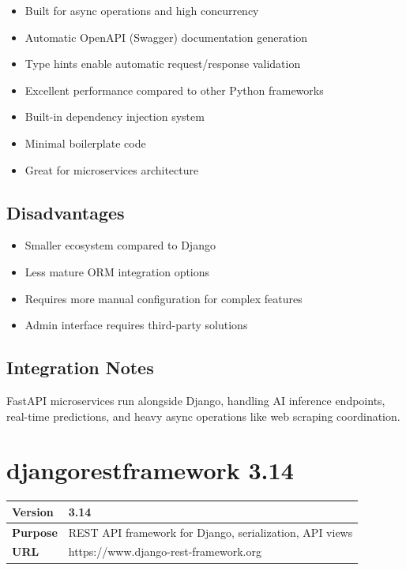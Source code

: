 \documentclass[12pt,a4paper]{report}
\begin{document}
\begin{itemize}
    \item Built for async operations and high concurrency
    \item Automatic OpenAPI (Swagger) documentation generation
    \item Type hints enable automatic request/response validation
    \item Excellent performance compared to other Python frameworks
    \item Built-in dependency injection system
    \item Minimal boilerplate code
    \item Great for microservices architecture
\end{itemize}

\subsection{Disadvantages}

\begin{itemize}
    \item Smaller ecosystem compared to Django
    \item Less mature ORM integration options
    \item Requires more manual configuration for complex features
    \item Admin interface requires third-party solutions
\end{itemize}

\subsection{Integration Notes}

FastAPI microservices run alongside Django, handling AI inference endpoints, real-time predictions, and heavy async operations like web scraping coordination.

\section{djangorestframework 3.14}

\begin{tabular}{|p{4cm}|p{10cm}|}
\hline
\textbf{Version} & 3.14 \\
\hline
\textbf{Purpose} & REST API framework for Django, serialization, API views \\
\hline
\textbf{URL} & https://www.django-rest-framework.org \\
\hline
\end{tabular}
\end{document}
